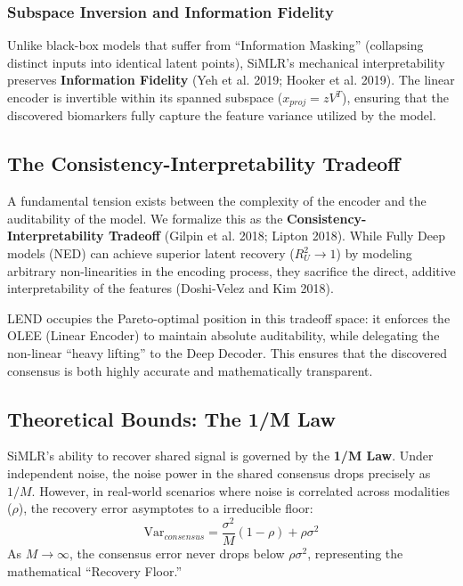 \documentclass[
  letterpaper,
]{report}
\begin{document}
\subsubsection{Subspace Inversion and Information
Fidelity}\label{subspace-inversion-and-information-fidelity}

Unlike black-box models that suffer from ``Information Masking''
(collapsing distinct inputs into identical latent points), SiMLR's
mechanical interpretability preserves \textbf{Information Fidelity} (Yeh
et al. 2019; Hooker et al. 2019). The linear encoder is invertible
within its spanned subspace (\(x_{proj} = z V^T\)), ensuring that the
discovered biomarkers fully capture the feature variance utilized by the
model.

\subsection{The Consistency-Interpretability
Tradeoff}\label{the-consistency-interpretability-tradeoff}

A fundamental tension exists between the complexity of the encoder and
the auditability of the model. We formalize this as the
\textbf{Consistency-Interpretability Tradeoff} (Gilpin et al. 2018;
Lipton 2018). While Fully Deep models (NED) can achieve superior latent
recovery (\(R^2_U \to 1\)) by modeling arbitrary non-linearities in the
encoding process, they sacrifice the direct, additive interpretability
of the features (Doshi-Velez and Kim 2018).

LEND occupies the Pareto-optimal position in this tradeoff space: it
enforces the OLEE (Linear Encoder) to maintain absolute auditability,
while delegating the non-linear ``heavy lifting'' to the Deep Decoder.
This ensures that the discovered consensus is both highly accurate and
mathematically transparent.

\subsection{Theoretical Bounds: The 1/M
Law}\label{theoretical-bounds-the-1m-law}

SiMLR's ability to recover shared signal is governed by the \textbf{1/M
Law}. Under independent noise, the noise power in the shared consensus
drops precisely as \(1/M\). However, in real-world scenarios where noise
is correlated across modalities (\(\rho\)), the recovery error
asymptotes to a irreducible floor:
\[ \text{Var}_{consensus} = \frac{\sigma^2}{M} (1 - \rho) + \rho \sigma^2 \]
As \(M \to \infty\), the consensus error never drops below
\(\rho \sigma^2\), representing the mathematical ``Recovery Floor.''
\end{document}
